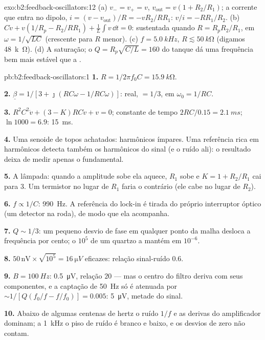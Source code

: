 \begin{solution}{exo:b2:feedback-oscillators:12}
(a) $v_- = v_+ = v$, $v_{\text{out}} = v(1 + R_2/R_1)$; a corrente que entra no
dipolo, $i = (v - v_{\text{out}})/R = -vR_2/RR_1$: $v/i = -RR_1/R_2$. (b) $C\dot v +
v(1/R_p - R_2/RR_1) + \frac1L\int v\,\dd t = 0$: sustentada quando $R = R_pR_2/R_1$,
em $\omega = 1/\sqrt{LC}$ (crescente para $R$ menor). (c) $f = \qty{5.0}{kHz}$, $R \lesssim
\qty{50}{k\ohm}$ (digamos \qty{48}{k\ohm}). (d) A saturação; o $Q = R_p
\sqrt{C/L} = 160$ do tanque dá uma frequência bem mais estável que a .
\end{solution}

\begin{solution}{pb:b2:feedback-oscillators:1}
\textbf{1.} $R = 1/2\pi f_0C = \qty{15.9}{k\ohm}$.

\textbf{2.} $\underline\beta = 1/[3 + \jmath(RC\omega - 1/RC\omega)]$: real, $= 1/3$, em
$\omega_0 = 1/RC$.

\textbf{3.} $R^2C^2\ddot v + (3 - K)RC\dot v + v = 0$; constante de tempo $2RC/0.15 =
\qty{2.1}{ms}$; $\ln1000 = 6.9$: \qty{15}{ms}.

\textbf{4.} Uma senoide de topos achatados: harmônicos ímpares. Uma referência rica
em harmônicos detecta também os harmônicos do sinal (e o ruído ali):
o resultado deixa de medir apenas o fundamental.

\textbf{5.} A lâmpada: quando a amplitude sobe ela aquece, $R_1$ sobe e
$K = 1 + R_2/R_1$ cai para $3$. Um termistor no lugar de $R_1$ faria
o contrário (ele cabe no lugar de $R_2$).

\textbf{6.} $f \propto 1/C$: \qty{990}{Hz}. A referência do lock-in é tirada do
próprio interruptor óptico (um detector na roda), de modo que ela acompanha.

\textbf{7.} $Q \sim 1/3$: um pequeno desvio de fase em qualquer ponto da malha desloca a
frequência por cento; o $10^5$ de um quartzo a mantém em $10^{-6}$.

\textbf{8.} $50\,\text{nV} \times \sqrt{10^5} = \qty{16}{\micro V}$ eficazes: relação sinal-ruído $0.6$.

\textbf{9.} $B = \qty{100}{Hz}$: \qty{0.5}{\micro V}, relação $20$ --- mas o centro do filtro
deriva com seus componentes, e a captação de \qty{50}{Hz} só é
atenuada por $\sim 1/[Q(f_0/f - f/f_0)] = 0.005$: \qty{5}{\micro V}, metade do
sinal.

\textbf{10.} Abaixo de algumas centenas de hertz o ruído $1/f$ e as derivas do
amplificador dominam; a \qty{1}{kHz} o piso de ruído é branco e baixo, e os
desvios de zero não contam.


\end{solution}

